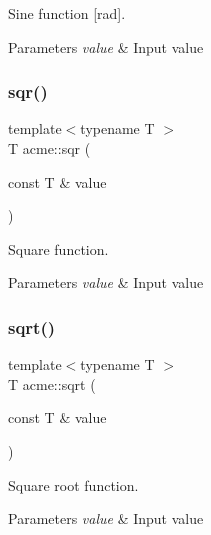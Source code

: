 Sine function \mbox{[}rad\mbox{]}. 


\begin{DoxyParams}{Parameters}
{\em value} & Input value \\
\hline
\end{DoxyParams}
\mbox{\label{namespaceacme_a722297e283d0b656d1b3f64222acb175}} 
\subsubsection{\texorpdfstring{sqr()}{sqr()}}
{\footnotesize\ttfamily template$<$typename T $>$ \\
T acme\+::sqr (\begin{DoxyParamCaption}\item[{const T \&}]{value }\end{DoxyParamCaption})\hspace{0.3cm}{\ttfamily [inline]}}



Square function. 


\begin{DoxyParams}{Parameters}
{\em value} & Input value \\
\hline
\end{DoxyParams}
\mbox{\label{namespaceacme_a6727bc4e9b202cb40e59065a01d9368b}} 
\subsubsection{\texorpdfstring{sqrt()}{sqrt()}}
{\footnotesize\ttfamily template$<$typename T $>$ \\
T acme\+::sqrt (\begin{DoxyParamCaption}\item[{const T \&}]{value }\end{DoxyParamCaption})\hspace{0.3cm}{\ttfamily [inline]}}



Square root function. 


\begin{DoxyParams}{Parameters}
{\em value} & Input value \\
\hline
\end{DoxyParams}
\mbox{\label{namespaceacme_a0fa0c6c9aef80a18fe865938fa2cb01d}} 
